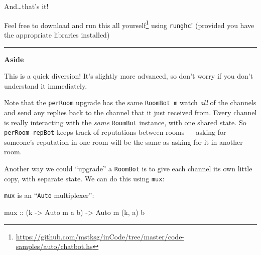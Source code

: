 \documentclass[]{article}
\newenvironment{Shaded}{}{}
\newcommand{\CommentTok}[1]{\textcolor[rgb]{0.38,0.63,0.69}{\textit{#1}}}
\newcommand{\DataTypeTok}[1]{\textcolor[rgb]{0.56,0.13,0.00}{#1}}
\newcommand{\FunctionTok}[1]{\textcolor[rgb]{0.02,0.16,0.49}{#1}}
\newcommand{\KeywordTok}[1]{\textcolor[rgb]{0.00,0.44,0.13}{\textbf{#1}}}
\newcommand{\NormalTok}[1]{#1}
\newcommand{\OperatorTok}[1]{\textcolor[rgb]{0.40,0.40,0.40}{#1}}
\newcommand{\OtherTok}[1]{\textcolor[rgb]{0.00,0.44,0.13}{#1}}
\renewcommand{\href}[2]{#2\footnote{\url{#1}}}
\begin{document}
And\ldots that's it!

Feel free to
\href{https://github.com/mstksg/inCode/tree/master/code-samples/auto/chatbot.hs}{download
and run this all yourself} using \texttt{runghc}! (provided you have the
appropriate libraries installed)

\begin{center}\rule{0.5\linewidth}{\linethickness}\end{center}

\textbf{Aside}

This is a quick diversion! It's slightly more advanced, so don't worry if you
don't understand it immediately.

Note that the \texttt{perRoom} upgrade has the same \texttt{RoomBot\ m} watch
\emph{all} of the channels and send any replies back to the channel that it just
received from. Every channel is really interacting with the \emph{same}
\texttt{RoomBot} instance, with one shared state. So \texttt{perRoom\ repBot}
keeps track of reputations between rooms --- asking for someone's reputation in
one room will be the same as asking for it in another room.

Another way we could ``upgrade'' a \texttt{RoomBot} is to give each channel its
own little copy, with separate state. We can do this using \texttt{mux}:

\begin{Shaded}
\end{Shaded}

\texttt{mux} is an ``\texttt{Auto} multiplexer'':

\begin{Shaded}
\begin{Highlighting}[]
\OtherTok{mux ::}\NormalTok{ (k }\OtherTok{{-}>} \DataTypeTok{Auto}\NormalTok{ m a b) }\OtherTok{{-}>} \DataTypeTok{Auto}\NormalTok{ m (k, a) b}
\end{Highlighting}
\end{Shaded}
\end{document}
